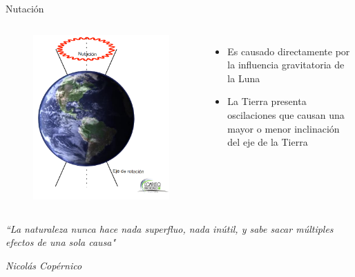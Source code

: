 \documentclass{beamer}
\begin{document}
\begin{frame}{Nutación}
 \begin{columns}
  \begin{figure}
   \centering
   \includegraphics[scale=0.3]{Imagenes/Nutacion_01}
  \end{figure}
 \small
 \justify
\begin{itemize}
\item Es causado directamente por la influencia gravitatoria de la Luna
\item La Tierra presenta oscilaciones que causan una mayor o menor inclinación del eje de la Tierra
\end{itemize}
 \end{columns}
\end{frame}

\begin{frame}
\begin{center}
\Huge 
\textit{``La naturaleza nunca hace nada superfluo, nada inútil, y sabe sacar múltiples efectos de una sola causa"}
\end{center}
\begin{flushright}
\small
\textit{Nicolás Copérnico}
\end{flushright}
\end{frame}
\end{document}

